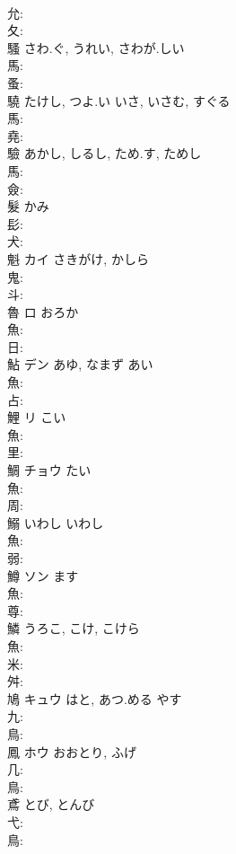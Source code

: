 \documentclass[8pt]{extreport}
\begin{document}
\begin{CJK}{UTF8}{min}
\\	允: 
\\	夂: 
\\	騷		さわ.ぐ, うれい, さわが.しい				
\\	馬: 
\\	蚤: 
\\	驍		たけし, つよ.い	いさ, いさむ, すぐる			
\\	馬: 
\\	堯: 
\\	驗		あかし, しるし, ため.す, ためし				
\\	馬: 
\\	僉: 
\\	髮		かみ				
\\	髟: 
\\	犬: 
\\	魁	カイ	さきがけ, かしら		
\\	鬼: 
\\	斗: 
\\	魯	ロ	おろか		
\\	魚: 
\\	日: 
\\	鮎	デン	あゆ, なまず	あい	
\\	魚: 
\\	占: 
\\	鯉	リ	こい		
\\	魚: 
\\	里: 
\\	鯛	チョウ	たい		
\\	魚: 
\\	周: 
\\	鰯	いわし	いわし		
\\	魚: 
\\	弱: 
\\	鱒	ソン	ます		
\\	魚: 
\\	尊: 
\\	鱗		うろこ, こけ, こけら			
\\	魚: 
\\	米: 
\\	舛: 
\\	鳩	キュウ	はと, あつ.める	やす	
\\	九: 
\\	鳥: 
\\	鳳	ホウ		おおとり, ふげ	
\\	几: 
\\	鳥: 
\\	鳶		とび, とんび			
\\	弋: 
\\	鳥: 

\end{CJK}
\end{document}
